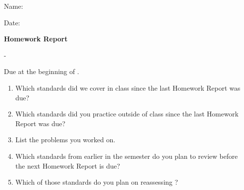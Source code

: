 

\usepackage[top=1in,bottom=1in,left=1in,right=1in]{geometry}

\pagestyle{empty}




\begin{flushright}
  Name: \underline{\hspace{3in}}

  \vspace{1em}

  Date: \underline{\hspace{2in}}
\end{flushright}

\begin{center}
  \Large
  \textbf{Homework Report}
\end{center}

\begin{center}
  \large \course{} - \prof{}
\end{center}

\begin{center}
  Due at the beginning of .
\end{center}

\begin{enumerate}[1)]
\item Which standards did we cover in class since the last Homework Report
      was due?

      \vfill
\item Which standards did you practice outside of class since the last
      Homework Report was due?

      \vfill
\item List the problems you worked on. 

      \vfill\vfill
\item Which standards from earlier in the semester do you plan to review
      before the next Homework Report is due?

      \vfill
\item Which of those standards do you plan on reassessing ?

      \vfill
\end{enumerate}


